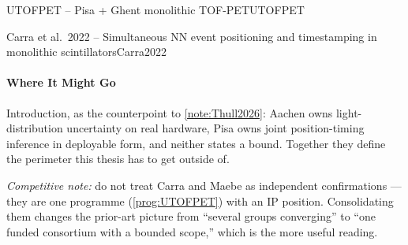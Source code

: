 \begin{programnote}{UTOFPET -- Pisa + Ghent monolithic TOF-PET}{UTOFPET}
\begin{papernote}{Carra et al.\ 2022 -- Simultaneous NN event positioning and timestamping in monolithic scintillators}{Carra2022}
\paragraph{Where It Might Go}
Introduction, as the counterpoint to \ref{note:Thull2026}: Aachen owns
light-distribution uncertainty on real hardware, Pisa owns joint position-timing
inference in deployable form, and neither states a bound. Together they define
the perimeter this thesis has to get outside of.

\emph{Competitive note:} do not treat Carra and Maebe as independent
confirmations --- they are one programme (\ref{prog:UTOFPET}) with an IP
position. Consolidating them changes the prior-art picture from ``several groups
converging'' to ``one funded consortium with a bounded scope,'' which is the more
useful reading.

\end{papernote}

\end{programnote}


 
